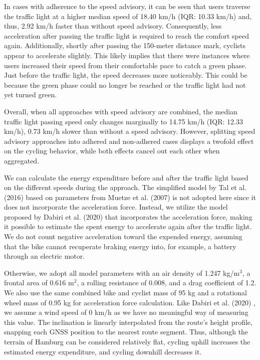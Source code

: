 In cases with adherence to the speed advisory, it can be seen that users traverse the traffic light at a higher median speed of 18.40 km/h (IQR: 10.33 km/h) and, thus, 2.92 km/h faster than without speed advisory. Consequently, less acceleration after passing the traffic light is required to reach the comfort speed again. Additionally, shortly after passing the 150-meter distance mark, cyclists appear to accelerate slightly. This likely implies that there were instances where users increased their speed from their comfortable pace to catch a green phase. Just before the traffic light, the speed decreases more noticeably. This could be because the green phase could no longer be reached or the traffic light had not yet turned green.

Overall, when all approaches with speed advisory are combined, the median traffic light passing speed only changes marginally to 14.75 km/h (IQR: 12.33 km/h), 0.73 km/h slower than without a speed advisory. However, splitting speed advisory approaches into adhered and non-adhered cases displays a twofold effect on the cycling behavior, while both effects cancel out each other when aggregated.

We can calculate the energy expenditure before and after the traffic light based on the different speeds during the approach. The simplified model by Tal et al. (2016) \cite{tal_vehicular-communications-based_2016} based on parameters from Muetze et al. (2007) \cite{muetze_electric_2007} is not adopted here since it does not incorporate the acceleration force. Instead, we utilize the model proposed by Dabiri et al. (2020) \cite{dabiri_optimized_2020} that incorporates the acceleration force, making it possible to estimate the spent energy to accelerate again after the traffic light. We do not count negative acceleration toward the expended energy, assuming that the bike cannot recuperate braking energy into, for example, a battery through an electric motor.

Otherwise, we adopt all model parameters with an air density of 1.247 kg/m$^3$, a frontal area of 0.616 m$^2$, a rolling resistance of 0.008, and a drag coefficient of 1.2. We also use the same combined bike and cyclist mass of 95 kg and a rotational wheel mass of 0.95 kg for acceleration force calculation. Like Dabiri et al. (2020) \cite{dabiri_optimized_2020}, we assume a wind speed of 0 km/h as we have no meaningful way of measuring this value. The inclination is linearly interpolated from the route's height profile, snapping each GNSS position to the nearest route segment. Thus, although the terrain of Hamburg can be considered relatively flat, cycling uphill increases the estimated energy expenditure, and cycling downhill decreases it.

